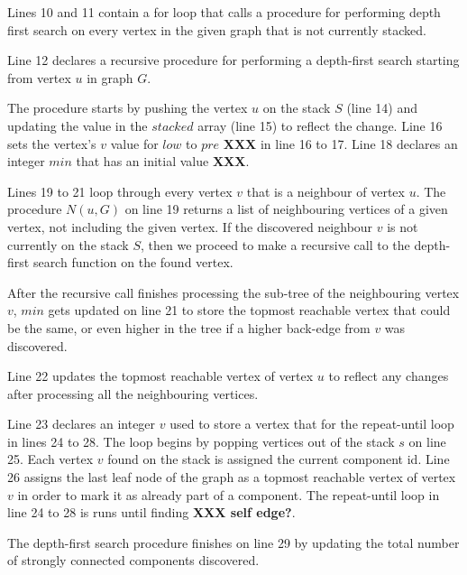 \documentclass{l4proj}
\begin{document}
\noindent Lines 10 and 11 contain a for loop that calls a procedure for performing depth first search on every vertex in the given graph that is not currently stacked.

\noindent Line 12 declares a recursive procedure for performing a depth-first search starting from vertex $u$ in graph $G$.

\noindent The procedure starts by pushing the vertex $u$ on the stack $S$ (line 14) and updating the value in the $stacked$ array (line 15) to reflect the change. Line 16 sets the vertex's $v$ value for $low$ to $pre$ \textbf{XXX} in line 16 to 17. Line 18 declares an integer $min$ that has an initial value \textbf{XXX}.

\noindent Lines 19 to 21 loop through every vertex $v$ that is a neighbour of vertex $u$. The procedure $N(u, G)$ on line 19 returns a list of neighbouring vertices of a given vertex, not including the given vertex. If the discovered neighbour $v$ is not currently on the stack $S$, then we proceed to make a recursive call to the depth-first search function on the found vertex.

\noindent After the recursive call finishes processing the sub-tree of the neighbouring vertex $v$, $min$ gets updated on line 21 to store the topmost reachable vertex that could be the same, or even higher in the tree if a higher back-edge from $v$ was discovered.

\noindent Line 22 updates the topmost reachable vertex of vertex $u$ to reflect any changes after processing all the neighbouring vertices.

\noindent Line 23 declares an integer $v$ used to store a vertex that for the repeat-until loop in lines 24 to 28. The loop begins by popping vertices out of the stack $s$ on line 25. Each vertex $v$ found on the stack is assigned the current component id. Line 26 assigns the last leaf node of the graph as a topmost reachable vertex of vertex $v$ in order to mark it as already part of a component. The repeat-until loop in line 24 to 28 is runs until finding \textbf{XXX self edge?}.

\noindent The depth-first search procedure finishes on line 29 by updating the total number of strongly connected components discovered.

\clearpage
\end{document}
